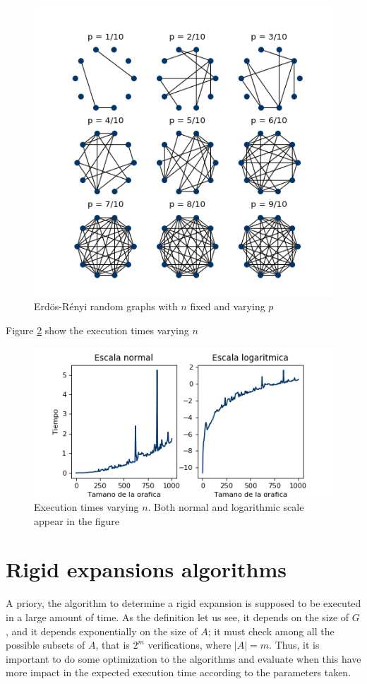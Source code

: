 \begin{figure}[h]
	\centering
	\includegraphics[scale=0.85]{Figures/ER-10.png}
	\caption{Erdös-Rényi random graphs with $n$ fixed and varying $p$}
	\label{fig:ErdosRenyi10}
\end{figure}

Figure \ref{fig:tiemposER} show the execution times varying $n$
\begin{figure}[h!]
	\centering
	\includegraphics[scale=0.7]{Python/Figures/Times-ER.png}
	\caption{Execution times varying $n$. Both normal and logarithmic scale appear in the figure}
	\label{fig:tiemposER}
\end{figure}

\section{Rigid expansions algorithms}
A priory, the algorithm to determine a rigid expansion is supposed to be executed in a large amount of time. As the definition let us see, it depends on the size of $G$, and it depends exponentially on the size of $A$; it must check among all the possible subsets of $A$, that is $2^{m}$ verifications, where $|A|=m$. Thus, it is important to do some optimization to the algorithms and evaluate when this have more impact in the expected execution time according to the parameters taken.


